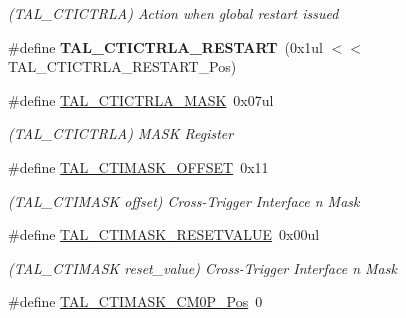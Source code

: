 \begin{DoxyCompactItemize}
\begin{DoxyCompactList}\small\item\em (T\+A\+L\+\_\+\+C\+T\+I\+C\+T\+R\+L\+A) Action when global restart issued \end{DoxyCompactList}\item 
\hypertarget{group___s_a_m_l21___t_a_l_ga96ad020731b863939bd9ac179f3263f0}{}\#define {\bfseries T\+A\+L\+\_\+\+C\+T\+I\+C\+T\+R\+L\+A\+\_\+\+R\+E\+S\+T\+A\+R\+T}~(0x1ul $<$$<$ T\+A\+L\+\_\+\+C\+T\+I\+C\+T\+R\+L\+A\+\_\+\+R\+E\+S\+T\+A\+R\+T\+\_\+\+Pos)\label{group___s_a_m_l21___t_a_l_ga96ad020731b863939bd9ac179f3263f0}

\item 
\hypertarget{group___s_a_m_l21___t_a_l_ga7565376c3aca20ad2eabeaf3f0e6cabc}{}\#define \hyperlink{group___s_a_m_l21___t_a_l_ga7565376c3aca20ad2eabeaf3f0e6cabc}{T\+A\+L\+\_\+\+C\+T\+I\+C\+T\+R\+L\+A\+\_\+\+M\+A\+S\+K}~0x07ul\label{group___s_a_m_l21___t_a_l_ga7565376c3aca20ad2eabeaf3f0e6cabc}

\begin{DoxyCompactList}\small\item\em (T\+A\+L\+\_\+\+C\+T\+I\+C\+T\+R\+L\+A) M\+A\+S\+K Register \end{DoxyCompactList}\item 
\hypertarget{group___s_a_m_l21___t_a_l_ga483807842c34f4b1a7761c3e4f7d1330}{}\#define \hyperlink{group___s_a_m_l21___t_a_l_ga483807842c34f4b1a7761c3e4f7d1330}{T\+A\+L\+\_\+\+C\+T\+I\+M\+A\+S\+K\+\_\+\+O\+F\+F\+S\+E\+T}~0x11\label{group___s_a_m_l21___t_a_l_ga483807842c34f4b1a7761c3e4f7d1330}

\begin{DoxyCompactList}\small\item\em (T\+A\+L\+\_\+\+C\+T\+I\+M\+A\+S\+K offset) Cross-\/\+Trigger Interface n Mask \end{DoxyCompactList}\item 
\hypertarget{group___s_a_m_l21___t_a_l_ga3260eb8a5ac96a2671ce363ff5061ba4}{}\#define \hyperlink{group___s_a_m_l21___t_a_l_ga3260eb8a5ac96a2671ce363ff5061ba4}{T\+A\+L\+\_\+\+C\+T\+I\+M\+A\+S\+K\+\_\+\+R\+E\+S\+E\+T\+V\+A\+L\+U\+E}~0x00ul\label{group___s_a_m_l21___t_a_l_ga3260eb8a5ac96a2671ce363ff5061ba4}

\begin{DoxyCompactList}\small\item\em (T\+A\+L\+\_\+\+C\+T\+I\+M\+A\+S\+K reset\+\_\+value) Cross-\/\+Trigger Interface n Mask \end{DoxyCompactList}\item 
\hypertarget{group___s_a_m_l21___t_a_l_ga4001486ce437c5a8ba4c27b337c846b9}{}\#define \hyperlink{group___s_a_m_l21___t_a_l_ga4001486ce437c5a8ba4c27b337c846b9}{T\+A\+L\+\_\+\+C\+T\+I\+M\+A\+S\+K\+\_\+\+C\+M0\+P\+\_\+\+Pos}~0\label{group___s_a_m_l21___t_a_l_ga4001486ce437c5a8ba4c27b337c846b9}


\end{DoxyCompactItemize}

